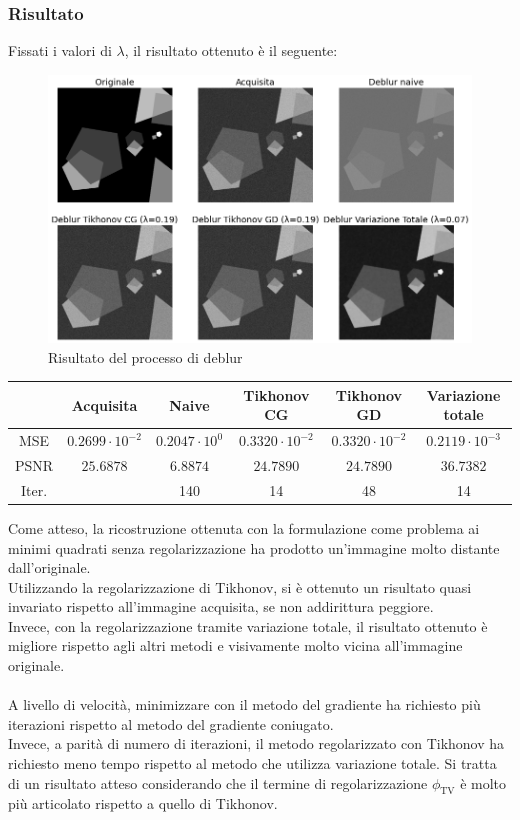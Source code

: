 \documentclass[11pt]{article}
\begin{document}
\subsubsection{Risultato}
Fissati i valori di $\lambda$, il risultato ottenuto è il seguente:\\
\begin{figure}[H]
    \centering
    \includegraphics[width=15cm]{esecuzione/1/deblur.png}
    \caption{Risultato del processo di deblur}
    \label{fig:deblur1}
\end{figure}

\begin{center}
    \begin{tabular}{ |c|c|c|c|c|c| }
    \hline
    & Acquisita & Naive & Tikhonov CG & Tikhonov GD & Variazione totale \\ 
    \hline
    MSE & $0.2699 \cdot 10^{-2}$ & $0.2047 \cdot 10^{0}$ & $0.3320 \cdot 10^{-2}$ & $0.3320 \cdot 10^{-2}$ & $0.2119 \cdot 10^{-3}$ \\ 
    PSNR & $25.6878$ & $6.8874$ & $24.7890$ & $24.7890$ & $36.7382$ \\ 
    Iter. & & 140 & 14 & 48 & 14 \\ 
    \hline
    \end{tabular}
\end{center}

Come atteso, la ricostruzione ottenuta con la formulazione come problema ai minimi quadrati senza regolarizzazione ha prodotto un'immagine molto distante dall'originale.\\
Utilizzando la regolarizzazione di Tikhonov, si è ottenuto un risultato quasi invariato rispetto all'immagine acquisita, se non addirittura peggiore.\\
Invece, con la regolarizzazione tramite variazione totale, il risultato ottenuto è migliore rispetto agli altri metodi e visivamente molto vicina all'immagine originale.\\~\\
A livello di velocità, minimizzare con il metodo del gradiente ha richiesto più iterazioni rispetto al metodo del gradiente coniugato. \\
Invece, a parità di numero di iterazioni, il metodo regolarizzato con Tikhonov ha richiesto meno tempo rispetto al metodo che utilizza variazione totale. Si tratta di un risultato atteso considerando che il termine di regolarizzazione $\phi_{\text{TV}}$ è molto più articolato rispetto a quello di Tikhonov.
\end{document}
